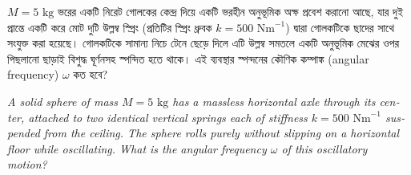 \documentclass[12pt, a4paper]{article}
\begin{document}
\begin{tcolorbox}[questionbox={প্রশ্ন (Question) 32}]
\noindent
$M = 5\text{ kg}$ ভরের একটি নিরেট গোলকের কেন্দ্র দিয়ে একটি ভরহীন অনুভূমিক অক্ষ প্রবেশ করানো আছে, যার দুই প্রান্তে একটি করে মোট দুটি উল্লম্ব স্প্রিং (প্রতিটির স্প্রিং ধ্রুবক $k = 500\text{ Nm}^{-1}$) দ্বারা গোলকটিকে ছাদের সাথে সংযুক্ত করা হয়েছে। গোলকটিকে সামান্য নিচে টেনে ছেড়ে দিলে এটি উল্লম্ব সমতলে একটি অনুভূমিক মেঝের ওপর পিছলানো ছাড়াই বিশুদ্ধ ঘূর্ণনসহ স্পন্দিত হতে থাকে। এই ব্যবস্থার স্পন্দনের কৌণিক কম্পাঙ্ক (angular frequency) $\omega$ কত হবে?

\vspace{0.8em}
\begin{english}
\noindent\textit{\color{darkgray}
A solid sphere of mass $M = 5\text{ kg}$ has a massless horizontal axle through its center, attached to two identical vertical springs each of stiffness $k = 500\text{ Nm}^{-1}$ suspended from the ceiling. The sphere rolls purely without slipping on a horizontal floor while oscillating. What is the angular frequency $\omega$ of this oscillatory motion?
}
\end{english}
\end{tcolorbox}
\end{document}
